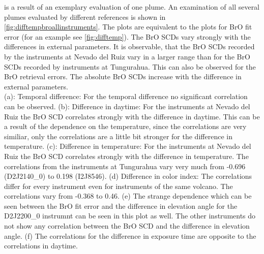 \documentclass  [
  paper    = a4,
  BCOR     = 10mm,
  twoside,
  fontsize = 12pt,
  fleqn,
  toc      = bibnumbered,
  toc      = listofnumbered,
  numbers  = noendperiod,
  headings = normal,
  listof   = leveldown,
  version  = 3.03
]                                       {scrreprt}
\begin{document}
	 is a result of an exemplary evaluation of one plume. An examination of all several plumes evaluated by different references is shown in \cref{fig:difftempbroallinstruments}. The plots are equivalent to the plots for BrO fit error (for an example see \cref{fig:difftemp}). The BrO SCDs vary strongly with the differences in external parameters. It is observable, that the BrO SCDs recorded by the instruments at Nevado del Ruiz vary in a larger range than for the BrO SCDs recorded by instruments at Tungurahua. This can also be observed for the BrO retrieval errors. The absolute BrO SCDs increase with the difference in external parameters.\\
	  (a): Temporal difference: For the temporal difference no significant correlation can be observed.
	 (b): Difference in daytime: For the instruments at Nevado del Ruiz the BrO SCD correlates strongly with the difference in daytime. This can be a result of the dependence on the temperature, since the correlations are very similiar, only the correlations are a little bit stronger for the difference in temperature.
	 (c): Difference in temperature: For the instruments at Nevado del Ruiz the BrO SCD correlates strongly with the difference in temperature. The correlations from the instruments at Tungurahua vary very much from -0.696 (D2J2140\_0) to 0.198 (I2J8546).
	  (d) Difference in color index: The correlations differ for every instrument even for instruments of the same volcano. The correlations vary from -0.368 to 0.46.
	  (e) The strange dependence which can be seen between the BrO fit error and the difference in elevation angle for the D2J2200\_0 instrumnt can be seen in this plot as well. The other instruments do not show any correlation between the BrO SCD and the difference in elevation angle.
	  (f) The correlations for the difference in exposure time are opposite to the correlations in daytime. 
\end{document}
